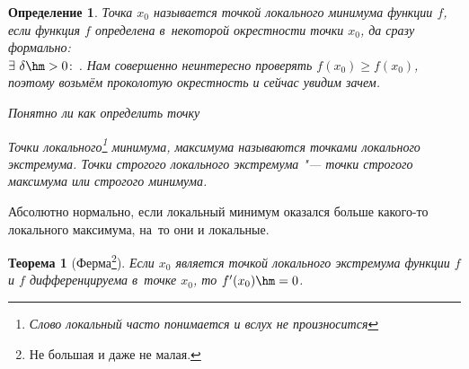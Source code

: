 \documentclass[a4paper,10pt,twoside]{article}
\newtheorem{Def}{Определение}[section]
\newtheorem{The}{Теорема}[section]
\begin{document}
\begin{Def}\label{ex}
    Точка $x_0$ называется точкой локального минимума функции $f$, если функция $f$ определена в~некоторой окрестности точки $x_0$, да сразу формально:\\
    $\exists\  \delta\hm>0\colon$. Нам совершенно неинтересно проверять $f(x_0)\geq f(x_0)$, поэтому возьмём проколотую окрестность и сейчас увидим зачем.


Понятно ли как определить точку 

Точки локального\footnote{Слово локальный часто понимается и вслух не произносится} минимума, максимума называются точками локального экстремума.
Точки строгого локального экстремума "--- точки строгого максимума или строгого минимума.

\end{Def}
 Абсолютно нормально, если локальный минимум оказался больше какого-то локального максимума, на~то они и локальные.


 \begin{The}[Ферма\footnote{Не большая и даже не малая.}]\label{Ferma} Если $x_0$ является точкой локального экстремума функции $f$ и $f$ дифференцируема в~точке $x_0$, то $f'(x_0)\hm=0$.

 \end{The}
\end{document}
